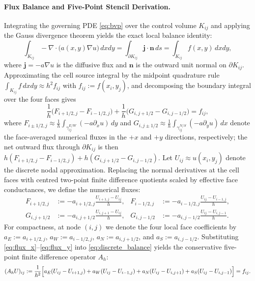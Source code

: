 \documentclass[11pt,a4paper]{article}
\theoremstyle{definition}
\theoremstyle{remark}
\begin{document}
\paragraph{Flux Balance and Five-Point Stencil Derivation.}
Integrating the governing PDE \eqref{eq:bvp} over the control volume $K_{ij}$ and applying the Gauss divergence theorem yields the exact local balance identity:
\begin{equation}
	\int_{K_{ij}} -\nabla\cdot\bigl(a(x,y)\nabla u\bigr)\,dxdy = \int_{\partial K_{ij}} \bm{j}\cdot\bm{n}\,ds = \int_{K_{ij}} f(x,y)\,dxdy,
	\label{eq:fv_balance}
\end{equation}
where $\bm{j} = -a\nabla u$ is the diffusive flux and $\bm{n}$ is the outward unit normal on $\partial K_{ij}$. Approximating the cell source integral by the midpoint quadrature rule $\int_{K_{ij}} f\,dxdy \approx h^2 f_{ij}$ with $f_{ij} := f(x_i,y_j)$, and decomposing the boundary integral over the four faces gives
\begin{equation}
	\frac{1}{h}\bigl(F_{i+1/2,j} - F_{i-1/2,j}\bigr) + \frac{1}{h}\bigl(G_{i,j+1/2} - G_{i,j-1/2}\bigr) = f_{ij},
	\label{eq:discrete_balance}
\end{equation}
where $F_{i\pm 1/2,j} \approx \frac{1}{h}\int_{\gamma_{ij}^{E/W}} (-a\partial_x u)\,dy$ and $G_{i,j\pm 1/2} \approx \frac{1}{h}\int_{\gamma_{ij}^{N/S}} (-a\partial_y u)\,dx$ denote the face-averaged numerical fluxes in the $+x$ and $+y$ directions, respectively; the net outward flux through $\partial K_{ij}$ is then $h(F_{i+1/2,j}-F_{i-1/2,j}) + h(G_{i,j+1/2}-G_{i,j-1/2})$. Let $U_{ij} \approx u(x_i, y_j)$ denote the discrete nodal approximation. Replacing the normal derivatives at the cell faces with centred two-point finite difference quotients scaled by effective face conductances, we define the numerical fluxes:
\begin{align}
	F_{i+1/2,j} &:= -a_{i+1/2,j}\frac{U_{i+1,j} - U_{ij}}{h}, & F_{i-1/2,j} &:= -a_{i-1/2,j}\frac{U_{ij} - U_{i-1,j}}{h}, \label{eq:flux_x} \\
	G_{i,j+1/2} &:= -a_{i,j+1/2}\frac{U_{i,j+1} - U_{ij}}{h}, & G_{i,j-1/2} &:= -a_{i,j-1/2}\frac{U_{ij} - U_{i,j-1}}{h}. \label{eq:flux_y}
\end{align}
For compactness, at node $(i,j)$ we denote the four local face coefficients by $a_E := a_{i+1/2,j}$, $a_W := a_{i-1/2,j}$, $a_N := a_{i,j+1/2}$, and $a_S := a_{i,j-1/2}$. Substituting \eqref{eq:flux_x}--\eqref{eq:flux_y} into \eqref{eq:discrete_balance} yields the conservative five-point finite difference operator $A_h$:
\begin{equation}
	(A_h U)_{ij} := \frac{1}{h^2}\Bigl[ a_E(U_{ij} - U_{i+1,j}) + a_W(U_{ij} - U_{i-1,j}) + a_N(U_{ij} - U_{i,j+1}) + a_S(U_{ij} - U_{i,j-1}) \Bigr] = f_{ij}.
	\label{eq:conservative_fdm}
\end{equation}
\end{document}
